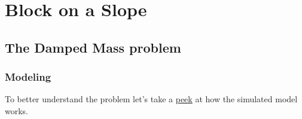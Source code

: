 \documentclass[
  8pt,
  a4paper,
]{book}
\begin{document}
\part{Block on a Slope}

\chapter{The Damped Mass problem}\label{the-damped-mass-problem}

\section{Modeling}\label{modeling}

To better understand the problem let's take a
\href{https://github.com/janismac/ControlChallenges/blob/gh-pages/js/models/BlockOnSlope.js}{peek}
at how the simulated model works.
\end{document}
